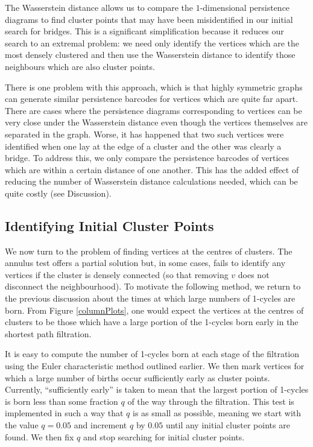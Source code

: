 \documentclass[12pt,a4paper]{amsart}
\numberwithin{equation}{section}
\theoremstyle{plain}
\theoremstyle{definition}
\begin{document}
\newpage

The Wasserstein distance allows us to compare the $1$-dimensional persistence diagrams to find cluster points that may have been misidentified in our initial search for bridges. This is a significant simplification because it reduces our search to an extremal problem: we need only identify the vertices which are the most densely clustered and then use the Wasserstein distance to identify those neighbours which are also cluster points. 

There is one problem with this approach, which is that highly symmetric graphs can generate similar persistence barcodes for vertices which are quite far apart. There are cases where the persistence diagrams corresponding to vertices can be very close under the Wasserstein distance even though the vertices themselves are separated in the graph. Worse, it has happened that two such vertices were identified when one lay at the edge of a cluster and the other was clearly a bridge. To address this, we only compare the persistence barcodes of vertices which are within a certain distance of one another. This has the added effect of reducing the number of Wasserstein distance calculations needed, which can be quite costly (see Discussion).

\subsection{Identifying Initial Cluster Points}

We now turn to the problem of finding vertices at the centres of clusters. The annulus test offers a partial solution but, in some cases, fails to identify any vertices if the cluster is densely connected (so that removing $v$ does not disconnect the neighbourhood). To motivate the following method, we return to the previous discussion about the times at which large numbers of 1-cycles are born. From Figure \ref{columnPlots}, one would expect the vertices at the centres of clusters to be those which have a large portion of the 1-cycles born early in the shortest path filtration. 

It is easy to compute the number of 1-cycles born at each stage of the filtration using the Euler characteristic method outlined earlier. We then mark vertices for which a large number of births occur sufficiently early as cluster points. Currently, ``sufficiently early'' is taken to mean that the largest portion of 1-cycles is born less than some fraction $q$ of the way through the filtration. This test is implemented in such a way that $q$ is as small as possible, meaning we start with the value $q=0.05$ and increment $q$ by $0.05$ until any initial cluster points are found. We then fix $q$ and stop searching for initial cluster points.
\end{document}
